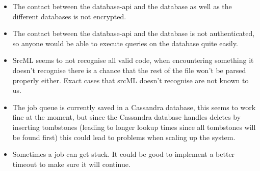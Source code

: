 \documentclass[./Main.tex]{subfiles}
\begin{document}
\begin{itemize}
    \item The contact between the database-api and the database as well as the different databases is not encrypted.
    \item The contact between the database-api and the database is not authenticated, so anyone would be able to execute queries on the database quite easily.
    \item SrcML seems to not recognise all valid code, when encountering something it doesn't recognise there is a chance that the rest of the file won't be parsed properly either. Exact cases that srcML doesn't recognise are not known to us.
    \item The job queue is currently saved in a Cassandra database, this seems to work fine at the moment, but since the Cassandra database handles deletes by inserting tombstones (leading to longer lookup times since all tombstones will be found first) this could lead to problems when scaling up the system.
    \item Sometimes a job can get stuck. It could be good to implement a better timeout to make sure it will continue.
\end{itemize}
\end{document}
